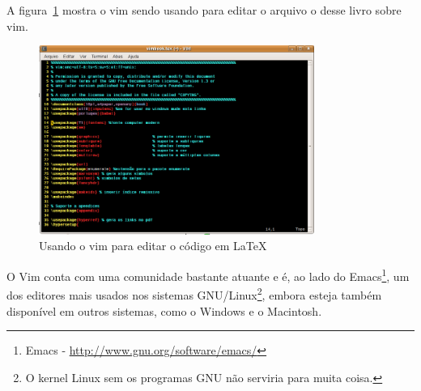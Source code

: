 A figura~\ref{fig:vimedittex} mostra o vim sendo usando para editar o arquivo
o desse livro sobre vim.

\begin{figure}[htp]
  \centering 
  \includegraphics[width=9cm]{img/vimedittex} %
  \caption{Usando o vim para editar o código em \LaTeX}
  \label{fig:vimedittex}
\end{figure}

O Vim conta com uma comunidade bastante atuante e é, ao lado do
Emacs\footnote{Emacs - \url{http://www.gnu.org/software/emacs/}}, um dos editores mais usados
nos sistemas GNU/Linux\footnote{O kernel Linux sem os programas GNU não
serviria para muita coisa.}, embora esteja também disponível em outros sistemas,
como o Windows e o Macintosh. %

